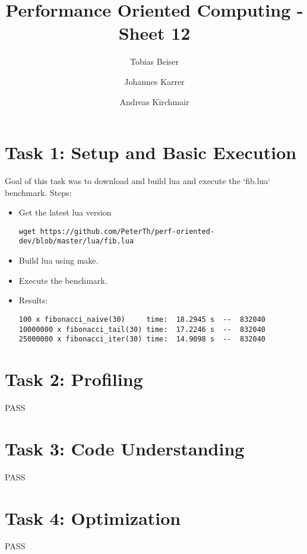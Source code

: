 \documentclass{article}
\title{Performance Oriented Computing - Sheet 12}
\author{Tobias Beiser \and Johannes Karrer \and Andreas Kirchmair}
\begin{document}
	\maketitle
	\section{Task 1: Setup and Basic Execution}
	Goal of this task was to download and build lua and execute the `fib.lua` benchmark.
	Steps:
	\begin{itemize}
		\item Get the latest lua version
		\begin{verbatim}
wget https://github.com/PeterTh/perf-oriented-dev/blob/master/lua/fib.lua			
		\end{verbatim}
		\item Build lua using make.
		\item Execute the benchmark.
		\item Results:
		\begin{verbatim}
100 x fibonacci_naive(30)     time:  18.2945 s  --  832040
10000000 x fibonacci_tail(30) time:  17.2246 s  --  832040
25000000 x fibonacci_iter(30) time:  14.9098 s  --  832040		
		\end{verbatim}
	\end{itemize}
	\section{Task 2: Profiling}
	PASS
	\section{Task 3: Code Understanding}
	PASS
	\section{Task 4: Optimization}
	PASS
\end{document}
